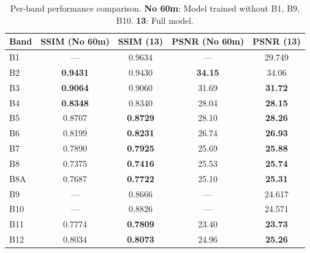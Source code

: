 \begin{table}[!htbp]
    \centering
    \caption{Per-band performance comparison. \textbf{No 60m}: Model trained without B1, B9, B10. \textbf{13}: Full model.}
    \label{tab:ablation_excluding_60m_per_band}
    \begin{tabular}{lcccc}
    \toprule
    \textbf{Band} & \textbf{SSIM (No 60m)} & \textbf{SSIM (13)} & \textbf{PSNR (No 60m)} & \textbf{PSNR (13)} \\
    \midrule
    B1   & ---    & 0.9634 & ---    & 29.749 \\
    B2 & \textbf{0.9431} & 0.9430 & \textbf{34.15} & 34.06 \\
    B3 & \textbf{0.9064} & 0.9060 & 31.69 & \textbf{31.72} \\
    B4 & \textbf{0.8348} & 0.8340 & 28.04 & \textbf{28.15} \\
    B5 & 0.8707 & \textbf{0.8729} & 28.10 & \textbf{28.26} \\
    B6 & 0.8199 & \textbf{0.8231} & 26.74 & \textbf{26.93} \\
    B7 & 0.7890 & \textbf{0.7925} & 25.69 & \textbf{25.88} \\
    B8 & 0.7375 & \textbf{0.7416} & 25.53 & \textbf{25.74} \\
    B8A & 0.7687 & \textbf{0.7722} & 25.10 & \textbf{25.31} \\
    B9   & ---    & 0.8666 & ---    & 24.617 \\
    B10  & ---    & 0.8826 & ---    & 24.571 \\
    B11 & 0.7774 & \textbf{0.7809} & 23.40 & \textbf{23.73} \\
    B12 & 0.8034 & \textbf{0.8073} & 24.96 & \textbf{25.26} \\
    \bottomrule
    \end{tabular}
\end{table}

